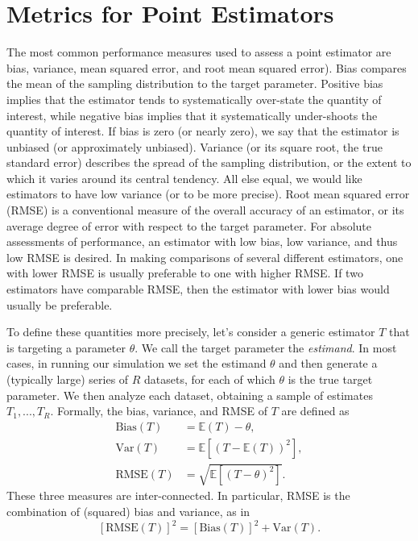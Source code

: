 \documentclass[
]{book}
\newcommand{\E}{\mathbb{E}}
\newcommand{\Var}{\text{Var}}
\newcommand{\Bias}{\text{Bias}}
\newcommand{\RMSE}{\text{RMSE}}
\begin{document}
\section{Metrics for Point Estimators}\label{assessing-point-estimators}

The most common performance measures used to assess a point estimator are bias, variance, mean squared error, and root mean squared error).
Bias compares the mean of the sampling distribution to the target parameter.
Positive bias implies that the estimator tends to systematically over-state the quantity of interest, while negative bias implies that it systematically under-shoots the quantity of interest.
If bias is zero (or nearly zero), we say that the estimator is unbiased (or approximately unbiased).
Variance (or its square root, the true standard error) describes the spread of the sampling distribution, or the extent to which it varies around its central tendency.
All else equal, we would like estimators to have low variance (or to be more precise).
Root mean squared error (RMSE) is a conventional measure of the overall accuracy of an estimator, or its average degree of error with respect to the target parameter.
For absolute assessments of performance, an estimator with low bias, low variance, and thus low RMSE is desired.
In making comparisons of several different estimators, one with lower RMSE is usually preferable to one with higher RMSE.
If two estimators have comparable RMSE, then the estimator with lower bias would usually be preferable.

To define these quantities more precisely, let's consider a generic estimator \(T\) that is targeting a parameter \(\theta\).
We call the target parameter the \emph{estimand}.
In most cases, in running our simulation we set the estimand \(\theta\) and then generate a (typically large) series of \(R\) datasets, for each of which \(\theta\) is the true target parameter.
We then analyze each dataset, obtaining a sample of estimates \(T_1,...,T_R\).
Formally, the bias, variance, and RMSE of \(T\) are defined as
\[
\begin{aligned}
\Bias(T) &= \E(T) - \theta, \\ 
\Var(T) &= \E\left[\left(T - \E (T)\right)^2 \right], \\
\RMSE(T) &= \sqrt{\E\left[\left(T - \theta\right)^2 \right]}.
\end{aligned}
\label{eq:bias-variance-RMSE}
\]
These three measures are inter-connected.
In particular, RMSE is the combination of (squared) bias and variance, as in
\[ 
\left[\RMSE(T)\right]^2 = \left[\Bias(T)\right]^2 + \Var(T). \label{eq:RMSE-decomposition}
\]
\end{document}
